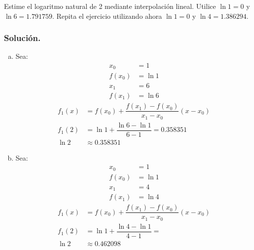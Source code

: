 \begin{example}{\rm
Estime el logaritmo natural de 2 mediante interpolación lineal. Utilice $\ln 1 = 0$ y $\ln 6 = 1.791759$. Repita el ejercicio utilizando 
ahora $\ln 1 = 0$ y $\ln 4 = 1.386294$.

\subsubsection*{Solución.} 

\begin{enumerate}[a)]
	\item Sea:
		\begin{align*}
			x_0 &= 1\\
			f(x_0) &= \ln 1\\
			x_1 &= 6 \\
			f(x_1) &= \ln 6
		\end{align*}
		\begin{align*}
			f_1(x) &= f(x_0) + \dfrac{f(x_1)-f(x_0)}{x_1-x_0}(x-x_0) \\
			f_1(2) &= \ln 1 + \dfrac{\ln 6 -\ln 1}{6-1} = 0.358351 \\
			\ln 2 &\approx 0.358351
		\end{align*}
		
	\item Sea:
		\begin{align*}
			x_0 &= 1\\
			f(x_0) &= \ln 1\\
			x_1 &= 4 \\
			f(x_1) &= \ln 4
		\end{align*}
		\begin{align*}
			f_1(x) &= f(x_0) + \dfrac{f(x_1)-f(x_0)}{x_1-x_0}(x-x_0) \\
			f_1(2) &= \ln 1 + \dfrac{\ln 4 -\ln 1}{4-1} =  \\
			\ln 2 &\approx 0.462098
		\end{align*}
\end{enumerate}
}\end{example}

